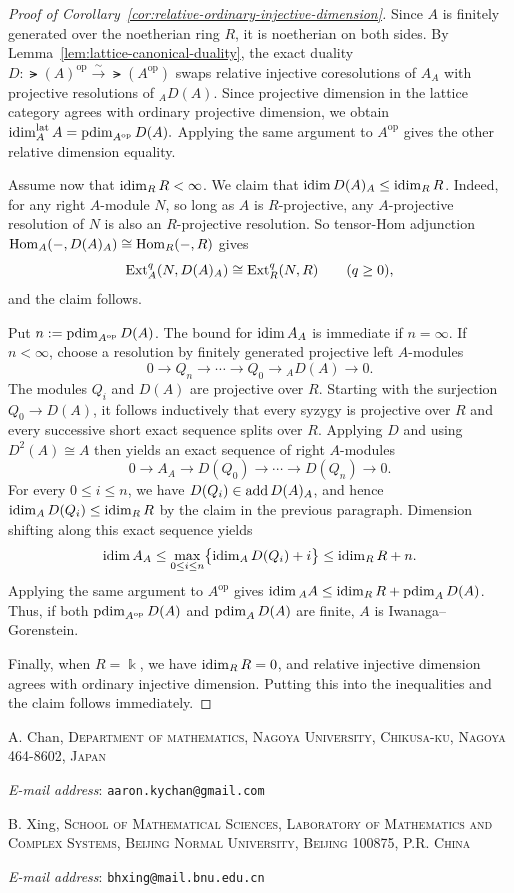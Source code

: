 \documentclass[a4paper,leqno]{amsart}
\makeatletter
\newcommand{\Addresses}{{%
  \bigskip
  \footnotesize

  A. Chan, \textsc{Department of mathematics, Nagoya University, Chikusa-ku, Nagoya 464-8602, Japan}\par\nopagebreak
  \textit{E-mail address}: \texttt{aaron.kychan@gmail.com}

  \medskip

  B. Xing, \textsc{School of Mathematical Sciences, Laboratory of Mathematics and Complex Systems, Beijing Normal University, Beijing 100875, P.R. China}\par\nopagebreak
  \textit{E-mail address}: \texttt{bhxing@mail.bnu.edu.cn}
}}
\makeatother
\begin{document}
\begin{proof}[Proof of Corollary~\ref{cor:relative-ordinary-injective-dimension}]
Since $A$ is finitely generated over the noetherian ring $R$, it is noetherian on both sides. By Lemma~\ref{lem:lattice-canonical-duality}, the exact duality $D:\lat(A)^{\operatorname{op}}
 \xrightarrow{\sim}\lat(A^{\operatorname{op}})$
swaps relative injective coresolutions of $A_A$ with projective resolutions of ${}_A D(A)$. Since projective dimension in the lattice category agrees with ordinary projective dimension, we obtain $\operatorname{idim}^{\operatorname{lat}}_A A
 =\operatorname{pdim}_{A^{\operatorname{op}}}D(A).$
Applying the same argument to $A^{\operatorname{op}}$ gives the other relative dimension equality.

Assume now that $\operatorname{idim}_R R<\infty$. 
We claim that $\operatorname{idim} D(A)_A\leq\operatorname{idim}_R R$.  Indeed, for any right $A$-module $N$, so long as $A$ is $R$-projective, any $A$-projective resolution of $N$ is also an $R$-projective resolution.  So tensor-Hom adjunction $\operatorname{Hom}_A(-,D(A)_A)\cong\operatorname{Hom}_R(-,R)$ gives
\[
 \operatorname{Ext}_A^q(N,D(A)_A)
 \cong \operatorname{Ext}_R^q(N,R)
 \qquad(q\geq0),
\]
and the claim follows.

Put $n:=\operatorname{pdim}_{A^{\operatorname{op}}}D(A)$. The bound for $\operatorname{idim} A_A$ is immediate if $n=\infty$. If $n<\infty$, choose a resolution by finitely generated projective left $A$-modules
\[
 0\longrightarrow Q_n\longrightarrow\cdots
 \longrightarrow Q_0\longrightarrow {}_A D(A)
 \longrightarrow0.
\]
The modules $Q_i$ and $D(A)$ are projective over $R$. Starting with the surjection $Q_0\to D(A)$, it follows inductively that every syzygy is projective over $R$ and every successive short exact sequence splits over $R$. Applying $D$ and using $D^2(A)\cong A$ then yields an exact sequence of right $A$-modules
\[
 0\longrightarrow A_A\longrightarrow D(Q_0)
 \longrightarrow\cdots\longrightarrow D(Q_n)
 \longrightarrow0.
\]
For every $0\leq i\leq n$, we have $D(Q_i)\in\operatorname{add} D(A)_A$, and hence $\operatorname{idim}_A D(Q_i)\leq\operatorname{idim}_R R$ by the claim in the previous paragraph. Dimension shifting along this exact sequence yields
\[
 \operatorname{idim} A_A
 \leq
 \max_{0\leq i\leq n}
 \bigl\{\operatorname{idim}_A D(Q_i)+i\bigr\}
 \leq \operatorname{idim}_R R+n.
\]
Applying the same argument to $A^{\operatorname{op}}$ gives
$\operatorname{idim} {}_A A\leq\operatorname{idim}_R R+\operatorname{pdim}_A D(A)$.  Thus, if both $\operatorname{pdim}_{A^{\operatorname{op}}}D(A)$ and $\operatorname{pdim}_{A}D(A)$ are finite, $A$ is Iwanaga--Gorenstein.

Finally, when $R=\Bbbk$, we have $\operatorname{idim}_R R=0$, and relative injective dimension agrees with ordinary injective dimension.  Putting this into the inequalities and the claim follows immediately.
\end{proof}



\Addresses
\end{document}
